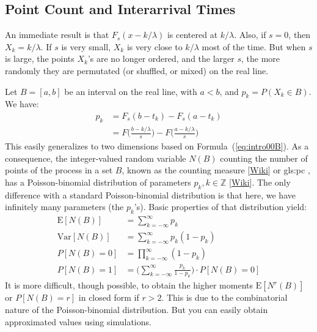 \documentclass[10pt]{article}
\begin{document}
\subsection{Point Count and Interarrival Times}\label{intro2}

An immediate result is that $F_s(x-k/\lambda)$ is centered at $k/\lambda$. Also, if $s=0$, then $X_k=k/\lambda$. If $s$ is very small, $X_k$ is very close to $k/\lambda$ most of the time. But when $s$ is large, the points $X_k$'s are no longer ordered, and the larger $s$, the more randomly they are permutated (or shuffled, or mixed) on the real line. 

Let $B=[a,b]$ be an interval on the real line, with $a<b$, and $p_k=P(X_k\in B)$. We have:
\begin{align}
p_k   & = F_s(b-t_k) - F_s(a-t_k) \nonumber \\
  & = F\Big(\frac{b-k/\lambda}{s}\Big)-F\Big(\frac{a-k/\lambda}{s}\Big)\label{eq:f0}
\end{align}
This easily generalizes to two dimensions based on Formula~(\ref{eq:intro00B}). As a consequence, the integer-valued random variable $N(B)$ counting the number of points of the process in  a set $B$, known as the \textcolor{index}{counting measure} [\href{https://en.wikipedia.org/wiki/Counting_measure}{Wiki}] or 
\gls{gls:pc} %
, has a
\textcolor{index}{Poisson-binomial distribution} of parameters $p_k,k\in\mathbb{Z}$ 
[\href{https://en.wikipedia.org/wiki/Poisson_binomial_distribution}{Wiki}]. The only difference with a standard Poisson-binomial distribution is that here, we have infinitely many parameters (the $p_k$'s). Basic properties of that distribution yield:
\begin{align}
\mbox{E}[N(B)] & = \sum_{k=-\infty}^\infty p_k \label{eq:f1}\\
\mbox{Var}[N(B)] & = \sum_{k=-\infty}^\infty p_k(1-p_k)\label{eq:f2} \\ 
P[N(B)=0] & = \prod_{k=-\infty}^\infty (1-p_k) \label{eq:f3} \\
P[N(B)=1] & = \Big(\sum_{k=-\infty}^{\infty}\frac{p_k}{1-p_k}\Big) \cdot P[N(B)=0]\label{eq:f4}
\end{align}
It is more difficult, though possible, to obtain the higher moments $\mbox{E}[N^r(B)]$ or $P[N(B)=r]$ in closed form if $r>2$. This is due to the combinatorial nature of the 
Poisson-binomial distribution. But you can easily obtain approximated values using simulations.
\end{document}
